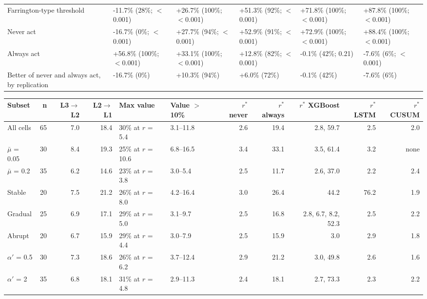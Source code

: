 \begin{landscape}
\begin{minipage}{\linewidth}
\begin{tabular}{llllll}
Farrington-type threshold & -11.7\% (28\%; $<$0.001) & +26.7\% (100\%; $<$0.001) & +51.3\% (92\%; $<$0.001) & +71.8\% (100\%; $<$0.001) & +87.8\% (100\%; $<$0.001) \\
Never act & -16.7\% (0\%; $<$0.001) & +27.7\% (94\%; $<$0.001) & +52.9\% (91\%; $<$0.001) & +72.9\% (100\%; $<$0.001) & +88.4\% (100\%; $<$0.001) \\
Always act & +56.8\% (100\%; $<$0.001) & +33.1\% (100\%; $<$0.001) & +12.8\% (82\%; $<$0.001) & -0.1\% (42\%; 0.21) & -7.6\% (6\%; $<$0.001) \\
Better of never and always act, by replication & -16.7\% (0\%) & +10.3\% (94\%) & +6.0\% (72\%) & -0.1\% (42\%) & -7.6\% (6\%) \\
\bottomrule
\end{tabular}
\end{minipage}
\vspace{14pt}

\end{landscape}
\noindent\begin{minipage}{\linewidth}
\label{tab:S21_1}
\centering\scriptsize
\begin{tabular}{lrrrllrrrrr}
\toprule
Subset & n & L3$\to$L2 & L2$\to$L1 & Max value & Value $>$ 10\% & $r^{*}$ never & $r^{*}$ always & $r^{*}$ XGBoost & $r^{*}$ LSTM & $r^{*}$ CUSUM \\ \midrule
All cells & 65 & 7.0 & 18.4 & 30\% at $r$ = 5.4 & 3.1–11.8 & 2.6 & 19.4 & 2.8, 59.7 & 2.5 & 2.0 \\
$\bar{\mu}$ = 0.05 & 30 & 8.4 & 19.3 & 25\% at $r$ = 10.6 & 6.8–16.5 & 3.4 & 33.1 & 3.5, 61.4 & 3.2 & none \\
$\bar{\mu}$ = 0.2 & 35 & 6.2 & 14.6 & 23\% at $r$ = 3.8 & 3.0–5.4 & 2.5 & 11.7 & 2.6, 37.0 & 2.2 & 2.4 \\
Stable & 20 & 7.5 & 21.2 & 26\% at $r$ = 8.0 & 4.2–16.4 & 3.0 & 26.4 & 44.2 & 76.2 & 1.9 \\
Gradual & 25 & 6.9 & 17.1 & 29\% at $r$ = 5.0 & 3.1–9.7 & 2.5 & 16.8 & 2.8, 6.7, 8.2, 52.3 & 2.5 & 2.2 \\
Abrupt & 20 & 6.7 & 15.9 & 29\% at $r$ = 4.4 & 3.0–7.9 & 2.5 & 15.9 & 3.0 & 2.9 & 1.8 \\
$\alpha'$ = 0.5 & 30 & 7.3 & 18.6 & 26\% at $r$ = 6.2 & 3.7–12.4 & 2.9 & 21.2 & 3.0, 49.8 & 2.6 & 1.6 \\
$\alpha'$ = 2 & 35 & 6.8 & 18.1 & 31\% at $r$ = 4.8 & 2.9–11.3 & 2.4 & 18.1 & 2.7, 73.3 & 2.3 & 2.2 \\
\bottomrule
\end{tabular}
\end{minipage}
\vspace{14pt}

